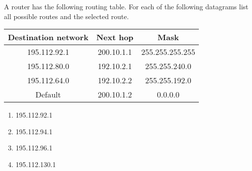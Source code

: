 \begin{Exercise}
A router has the following routing table. For each of the following datagrams list all possible routes and the selected route.

\begin{center}
\begin{tabular}{c c c}
    Destination network & Next hop   & Mask            \\ \hline
           195.112.92.1 & 200.10.1.1 & 255.255.255.255 \\ \hline
           195.112.80.0 & 192.10.2.1 & 255.255.240.0   \\ \hline
           195.112.64.0 & 192.10.2.2 & 255.255.192.0   \\ \hline
                Default & 200.10.1.2 & 0.0.0.0
\end{tabular}
\end{center}

\begin{enumerate}
    \item 195.112.92.1
    \item 195.112.94.1
    \item 195.112.96.1
    \item 195.112.130.1
\end{enumerate}
\end{Exercise}
